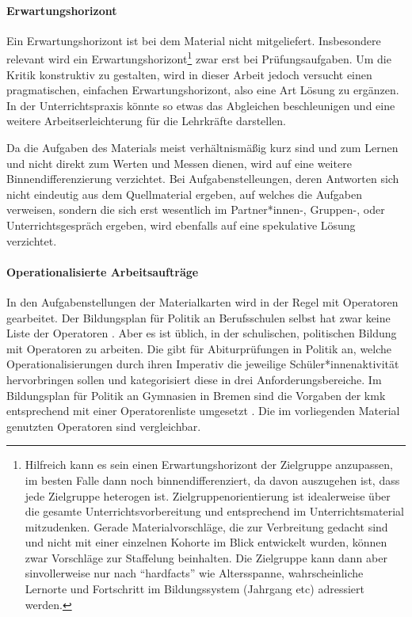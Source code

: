 \paragraph{Erwartungshorizont}
Ein Erwartungshorizont ist bei dem Material nicht mitgeliefert. Insbesondere relevant wird ein Erwartungshorizont\footnote{
    Hilfreich kann es sein einen Erwartungshorizont der Zielgruppe anzupassen, im besten Falle dann noch binnendifferenziert, da davon auszugehen ist, dass jede Zielgruppe heterogen ist. 
    Zielgruppenorientierung ist idealerweise über die gesamte Unterrichtsvorbereitung und entsprechend im Unterrichtsmaterial mitzudenken. Gerade Materialvorschläge, die zur Verbreitung gedacht sind und nicht mit einer einzelnen Kohorte im Blick entwickelt wurden, können zwar Vorschläge zur Staffelung beinhalten. Die Zielgruppe kann dann aber sinvollerweise nur nach \enquote{hardfacts} wie Altersspanne, wahrscheinliche Lernorte und Fortschritt im Bildungssystem (Jahrgang \gls{etc}) adressiert werden.} 
zwar erst bei Prüfungsaufgaben.
Um die Kritik konstruktiv zu gestalten, wird in dieser Arbeit jedoch versucht einen pragmatischen, einfachen Erwartungshorizont, also eine Art Lösung zu ergänzen. In der Unterrichtspraxis könnte so etwas das Abgleichen beschleunigen und eine weitere Arbeitserleichterung für die Lehrkräfte darstellen. 

Da die Aufgaben des Materials meist verhältnismäßig kurz sind und zum Lernen und nicht direkt zum Werten und Messen dienen, wird auf eine weitere Binnendifferenzierung verzichtet. Bei Aufgabenstelleungen, deren Antworten sich nicht eindeutig aus dem Quellmaterial ergeben, auf welches die Aufgaben verweisen, sondern die sich erst wesentlich im Partner*innen-, Gruppen-, oder Unterrichtsgespräch ergeben, wird ebenfalls auf eine spekulative Lösung verzichtet. 



\paragraph{Operationalisierte Arbeitsaufträge}
In den Aufgabenstellungen der Materialkarten wird in der Regel mit Operatoren gearbeitet. Der Bildungsplan für Politik an Berufsschulen selbst hat zwar keine Liste der Operatoren \autocite{bplan}. Aber es ist üblich, in der schulischen, politischen Bildung mit Operatoren zu arbeiten. Die \textcite[14-18]{KMK.2005} gibt für Abiturprüfungen in Politik an, welche Operationalisierungen durch ihren Imperativ die jeweilige Schüler*innenaktivität hervorbringen sollen und kategorisiert diese in drei Anforderungsbereiche. Im Bildungsplan für Politik an Gymnasien in Bremen sind die Vorgaben der \gls{kmk} entsprechend mit einer Operatorenliste umgesetzt \autocite[13-14]{lower2008}.
Die im vorliegenden Material genutzten Operatoren sind vergleichbar. 

